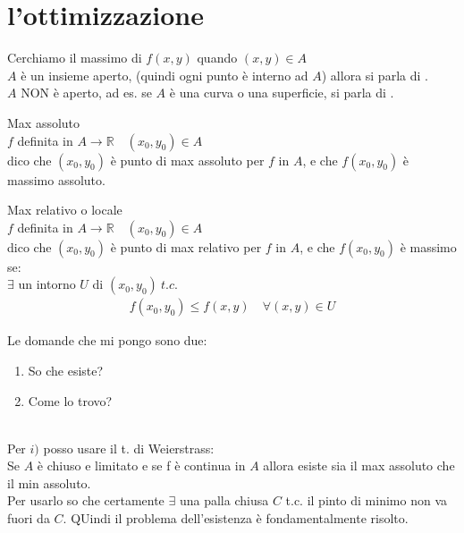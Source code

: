 \documentclass[a4paper, oneside]{article}
\begin{document}
\section{l'ottimizzazione}
Cerchiamo il massimo di $f(x,y)$ quando $(x,y) \in A$\\
 $A$ è un insieme aperto, (quindi ogni punto è interno ad $A$) allora si parla di .\\
 $A$ NON è aperto, ad es. se $A$ è una curva o una superficie, si parla di .\\
\begin{definition}
    Max assoluto\\
    $f$ definita in $A \to \mathbb{R} \quad (x_0,y_0) \in A$ \\
    dico che $(x_0,y_0)$ è punto di max assoluto per $f$ in $A$, e che $f(x_0,y_0)$ è massimo assoluto.\\ 
\end{definition}
\begin{definition}
    Max relativo o locale\\
    $f$ definita in $A \to \mathbb{R} \quad (x_0,y_0) \in A$ \\
    dico che $(x_0,y_0)$ è punto di max relativo per $f$ in $A$, e che $f(x_0,y_0)$ è massimo se:\\
    $\exists$ un intorno $U$ di $(x_0,y_0) \ t.c.$\\
    \begin{gather*}
        f(x_0,y_0) \leq f(x,y) \quad \forall (x,y) \in U
    \end{gather*} 
\end{definition}
Le domande che mi pongo sono due:
\begin{enumerate}[$i)$]
            \item So che esiste?
            \item Come lo trovo?
        \end{enumerate}            
        \hfil\\
        Per $i)$ posso usare il t. di Weierstrass:\\
        Se $A$ è chiuso e limitato e se f è continua in $A$ allora esiste sia il max assoluto che il min assoluto.\\
        Per usarlo so che certamente $\exists$ una palla chiusa $C$ t.c. il pinto di minimo non va fuori da $C$. QUindi il problema dell'esistenza è fondamentalmente risolto.\\
\end{document}
